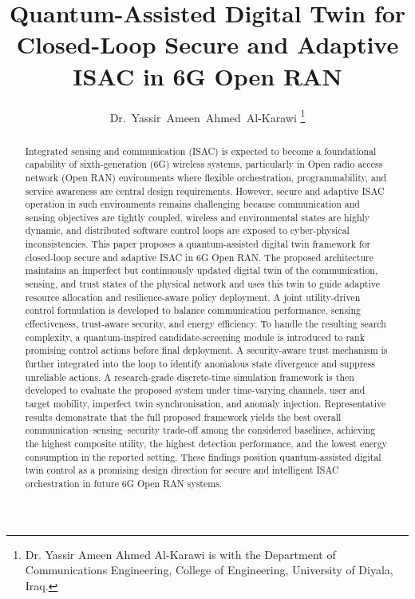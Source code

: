 \documentclass[10pt,journal]{IEEEtran}
\begin{document}
\title{Quantum-Assisted Digital Twin for Closed-Loop Secure and Adaptive ISAC in 6G Open RAN}

\author{Dr.~Yassir~Ameen~Ahmed~Al-Karawi%
\thanks{Dr. Yassir Ameen Ahmed Al-Karawi is with the Department of Communications Engineering, College of Engineering, University of Diyala, Iraq.}
}

\maketitle

\begin{abstract}
Integrated sensing and communication (ISAC) is expected to become a foundational capability of sixth-generation (6G) wireless systems, particularly in Open radio access network (Open RAN) environments where flexible orchestration, programmability, and service awareness are central design requirements. However, secure and adaptive ISAC operation in such environments remains challenging because communication and sensing objectives are tightly coupled, wireless and environmental states are highly dynamic, and distributed software control loops are exposed to cyber-physical inconsistencies. This paper proposes a quantum-assisted digital twin framework for closed-loop secure and adaptive ISAC in 6G Open RAN. The proposed architecture maintains an imperfect but continuously updated digital twin of the communication, sensing, and trust states of the physical network and uses this twin to guide adaptive resource allocation and resilience-aware policy deployment. A joint utility-driven control formulation is developed to balance communication performance, sensing effectiveness, trust-aware security, and energy efficiency. To handle the resulting search complexity, a quantum-inspired candidate-screening module is introduced to rank promising control actions before final deployment. A security-aware trust mechanism is further integrated into the loop to identify anomalous state divergence and suppress unreliable actions. A research-grade discrete-time simulation framework is then developed to evaluate the proposed system under time-varying channels, user and target mobility, imperfect twin synchronisation, and anomaly injection. Representative results demonstrate that the full proposed framework yields the best overall communication--sensing--security trade-off among the considered baselines, achieving the highest composite utility, the highest detection performance, and the lowest energy consumption in the reported setting. These findings position quantum-assisted digital twin control as a promising design direction for secure and intelligent ISAC orchestration in future 6G Open RAN systems.
\end{abstract}
\end{document}
